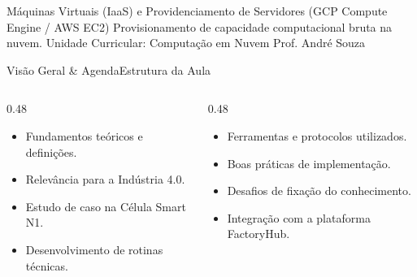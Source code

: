 
\senaicover
  {Máquinas Virtuais (IaaS) e Providenciamento de Servidores (GCP Compute Engine / AWS EC2)}
  {Provisionamento de capacidade computacional bruta na nuvem.}
  {Unidade Curricular: Computação em Nuvem}
  {Prof. André Souza}

\begin{senaiframe}{Visão Geral \& Agenda}{Estrutura da Aula}
  \begin{columns}[t]
    \begin{column}{0.48\textwidth}
      \begin{tcolorbox}[senaibluecard, title={1. Conceitos Chave}]
        \begin{itemize}
          \item Fundamentos teóricos e definições.
          \item Relevância para a Indústria 4.0.
        \end{itemize}
      \end{tcolorbox}
      \vspace{4pt}
      \begin{tcolorbox}[senaiambercard, title={3. Aplicação Prática}]
        \begin{itemize}
          \item Estudo de caso na Célula Smart N1.
          \item Desenvolvimento de rotinas técnicas.
        \end{itemize}
      \end{tcolorbox}
    \end{column}
    \begin{column}{0.48\textwidth}
      \begin{tcolorbox}[senairedcard, title={2. Detalhamento Técnico}]
        \begin{itemize}
          \item Ferramentas e protocolos utilizados.
          \item Boas práticas de implementação.
        \end{itemize}
      \end{tcolorbox}
      \vspace{4pt}
      \begin{tcolorbox}[senaigreencard, title={4. Exercícios \& Avaliação}]
        \begin{itemize}
          \item Desafios de fixação do conhecimento.
          \item Integração com a plataforma FactoryHub.
        \end{itemize}
      \end{tcolorbox}
    \end{column}
  \end{columns}
\end{senaiframe}

